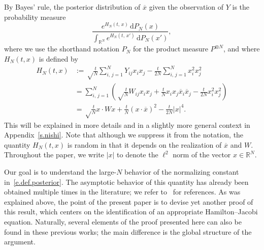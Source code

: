 \documentclass[AHL,Unicode,longabstracts,published]{cedram}
\newcommand{\R}{\mathbb{R}}
\renewcommand{\d}{\mathrm{d}}
\newcommand{\1}{\mathds{1}}
\renewcommand{\bar}{\overline}
\begin{document}
By Bayes' rule, the posterior distribution of $\bar x$ given the observation of $Y$ is the probability measure
\begin{equation}\label{e.def.posterior}
\frac { e^{H_N(t,\,x)} \, \d P_N(x)}{\int_{\R^N}e^{H_N(t,\,x')} \, \d P_N(x')},
\end{equation}
where we use the shorthand notation $P_N$ for the product measure $P^{\otimes N}$, and where $H_N(t,x)$ is defined by
\begin{equation}\label{e.def.H1}
\begin{aligned}
H_N(t,x) & :=
\sqrt \frac t N \sum_{i,\,j = 1}^N Y_{ij} x_i x_j - \frac t {2N}\sum_{i,\,j =1}^N x_i^2 x_j^2
\\
& = \sum_{i,\,j = 1}^N \left(\sqrt \frac t N W_{ij} x_i x_j + \frac t N x_i x_j \bar x_i \bar x_j- \frac t {2N} x_i^2 x_j^2 \right)
\\
& = \sqrt \frac t N x \cdot W x + \frac t N (x \cdot \bar x)^2 - \frac t {2N} |x|^4.
\end{aligned}
\end{equation}
This will be explained in more details and in a slightly more general context in Appendix~\ref{s.nishi}. Note that although we suppress it from the notation, the quantity $H_N(t,x)$ is random in that it depends on the realization of $\bar x$ and $W$. Throughout the paper, we write $|x|$ to denote the $\ell^2$ norm of the vector $x \in \R^N$.


Our goal is to understand the large-$N$ behavior of the normalizing constant in~\eqref{e.def.posterior}. The asymptotic behavior of this quantity has already been obtained multiple times in the literature; we refer to~\cite{bar1,bmm,bm1,dm,eak,lkz,lm} for references. As was explained above, the point of the present paper is to devise yet another proof of this result, which centers on the identification of an appropriate Hamilton--Jacobi equation. Naturally, several elements of the proof presented here can also be found in these previous works; the main difference is the global structure of the argument.


\end{document}
